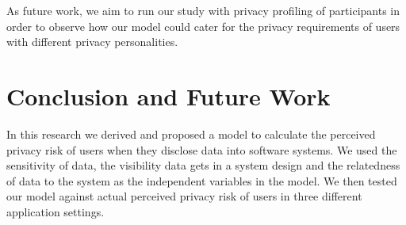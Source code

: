 \documentclass[10pt]{article}
\newcommand{\sansserifformat}[1]{\fontfamily{cmss}{ #1}}%
\begin{document}
As future work, we aim to run our study with privacy profiling of participants in order to observe how our model could cater for the privacy requirements of users with different privacy personalities. 



\section{Conclusion and Future Work}
In this research we derived and proposed a model to calculate the perceived privacy risk of users when they disclose data into software systems. We used the sensitivity of data, the visibility data gets in a system design and the relatedness of data to the system as the independent variables in the model. We then tested our model against actual perceived privacy risk of users in three different application settings. 









\end{document}
